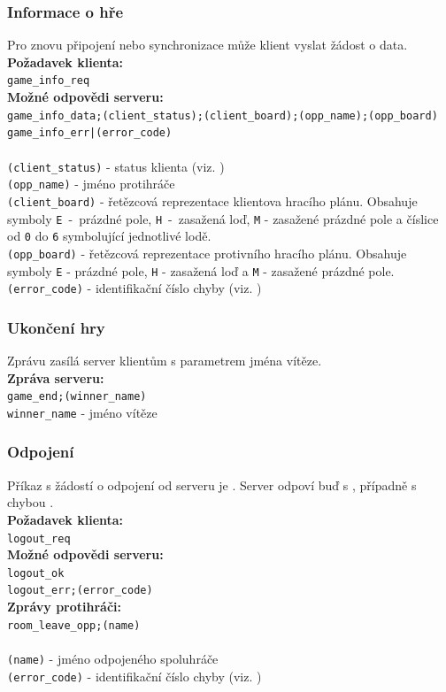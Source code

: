 \documentclass[12pt, a4paper]{article} %
\begin{document}
	\subsubsection{Informace o hře}
	\par Pro znovu připojení nebo synchronizace může klient vyslat žádost o data.\\
	\textbf{Požadavek klienta:}\\
	\texttt{game\_info\_req}\\
	\textbf{Možné odpovědi serveru:}\\
	\texttt{game\_info\_data;(client\_status);(client\_board);(opp\_name);(opp\_board)}\\
	\texttt{game\_info\_err|(error\_code)}\\\\
	\texttt{(client\_status)} - status klienta (viz. )\\
	\texttt{(opp\_name)} - jméno protihráče\\
	\texttt{(client\_board)} - řetězcová reprezentace klientova hracího plánu. Obsahuje symboly \texttt{E} - prázdné pole, \texttt{H} - zasažená loď, \texttt{M} - zasažené prázdné pole a číslice od \texttt{0} do \texttt{6} symbolující jednotlivé lodě.\\
	\texttt{(opp\_board)} - řetězcová reprezentace protivního hracího plánu. Obsahuje symboly \texttt{E} - prázdné pole, \texttt{H} - zasažená loď a \texttt{M} - zasažené prázdné pole.\\
	\texttt{(error\_code)} - identifikační číslo chyby (viz. )
	
	\subsubsection{Ukončení hry}
	\par Zprávu zasílá server klientům s parametrem jména vítěze.\\
	\textbf{Zpráva serveru:}\\
	\texttt{game\_end;(winner\_name)}\\
	\texttt{winner\_name} - jméno vítěze
	\subsubsection{Odpojení}
	\par Příkaz s žádostí o odpojení od serveru je . Server odpoví buď s , případně s chybou .\\
	\textbf{Požadavek klienta:}\\
	\texttt{logout\_req}\\
	\textbf{Možné odpovědi serveru:}\\
	\texttt{logout\_ok}\\
	\texttt{logout\_err;(error\_code)}\\
	\textbf{Zprávy protihráči:}\\
	\texttt{room\_leave\_opp;(name)}\\\\
	\texttt{(name)} - jméno odpojeného spoluhráče\\
	\texttt{(error\_code)} - identifikační číslo chyby (viz. )
	
\end{document}
